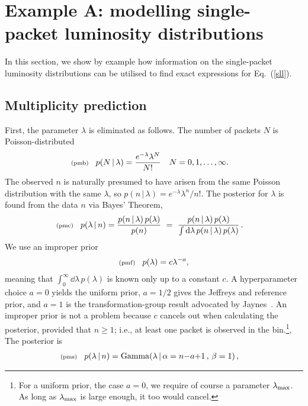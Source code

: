 \documentclass[11pt]{article}
\newcommand{\lleq}[1]{\label{#1} }
\renewcommand{\lleq}[1]{\label{#1} {\scriptstyle {\rm (#1)}} \hspace*{2ex} }
\newcommand{\cond}{\,|\,}
\DeclareMathOperator{\GammaDist}{Gamma}
\newcommand{\rmdx}[1]{\dd{#1}} %
\begin{document}
\section{Example A: modelling single-packet luminosity distributions}
\label{sec:example}

In this section, we show by example how information on the
single-packet luminosity distributions can be utilised to find exact
expressions for Eq.~(\ref{sll}).

\subsection{Multiplicity prediction}

First, the parameter $\lambda$ is eliminated as follows. The number of
packets $N$ is Poisson-distributed
\begin{align}
  \lleq{pmb}
  p(N\cond\lambda) &= \frac{e^{-\lambda}\lambda^{N}}{N!}
  \quad N = 0,1,\ldots,\infty.
\end{align}
The observed $n$ is naturally presumed to have arisen from the same Poisson
distribution with the same $\lambda$, so $p(n\cond\lambda) =
e^{-\lambda}\lambda^{n}/n!$. %
The posterior for $\lambda$ is found from the data $n$ via Bayes'
Theorem,
\begin{align}
  \lleq{pmc}
  p(\lambda\cond n) %
  &= \frac{p(n\cond\lambda)\,p(\lambda)} {p(n)}
  \ =\ \frac{p(n\cond\lambda)\,p(\lambda)} %
  {\int \rmdx{\lambda} p(n\cond\lambda)\,p(\lambda)} \,.
\end{align}
We use an improper prior
\begin{align}
  \lleq{pmf}
  p(\lambda) = c \lambda^{-a},
\end{align}
meaning that $\int_0^\infty \rmdx{\lambda}\,p(\lambda)$ is known only up to
a constant $c$. A hyperparameter choice $a=0$ yields the uniform
prior, $a=1/2$ gives the Jeffreys and reference prior, and $a=1$ is
the transformation-group result advocated by
Jaynes~\cite[Ch. 12]{jaynes2003probability}. An improper prior is not
a problem because $c$ cancels out when calculating the posterior,
provided that $n \ge 1$; i.e., at least one packet is observed in the
bin.\footnote{For a uniform prior, the case $a{=}0$, we require of
  course a parameter $\lambda_{\rm max}$. As long as
  $\lambda_{\rm max}$ is large enough, it too would cancel.}, The
posterior is
\begin{align}
  \lleq{pms}
  p(\lambda\cond n)
  &= \GammaDist(\lambda \cond \alpha = n{-}a{+}1 \,,\, \beta = 1)\,,
\end{align}
\end{document}
